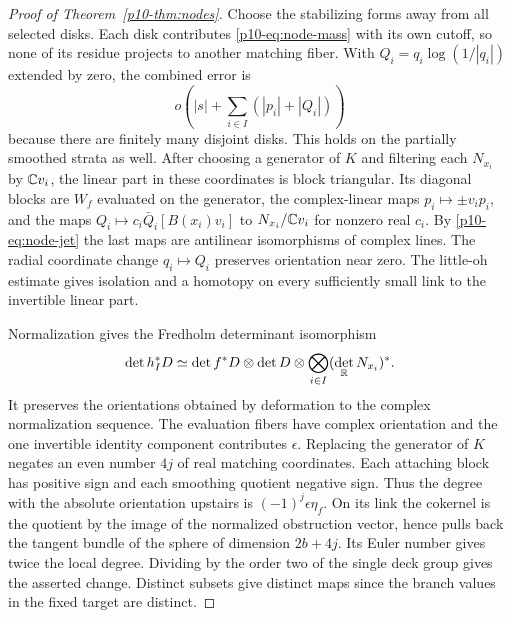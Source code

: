 \begin{proof}[Proof of Theorem~\ref{p10-thm:nodes}]
Choose the stabilizing forms away from all selected disks. Each disk
contributes \eqref{p10-eq:node-mass} with its own cutoff, so none of its
residue projects to another matching fiber. With $Q_i=q_i\log(1/|q_i|)$
extended by zero, the combined error is
\[
             o\left(|s|+\sum_{i\in I}(|p_i|+|Q_i|)\right)
\]
because there are finitely many disjoint disks. This holds on the
partially smoothed strata as well. After choosing a generator of $K$
and filtering each $N_{x_i}$ by $\mathbb C v_i$, the linear part in these
coordinates is block triangular. Its diagonal blocks are $W_f$
evaluated on the generator, the complex-linear maps
$p_i\mapsto\pm v_i p_i$, and the maps
$Q_i\mapsto c_i\bar Q_i[B(x_i)v_i]$ to $N_{x_i}/\mathbb C v_i$ for
nonzero real $c_i$. By \eqref{p10-eq:node-jet} the last maps are
antilinear isomorphisms of complex lines. The radial coordinate
change $q_i\mapsto Q_i$ preserves orientation near zero. The
little-oh estimate gives isolation and a homotopy on every sufficiently
small link to the invertible linear part.

Normalization gives the Fredholm determinant isomorphism
\[
  \det h_I^*D\simeq \det f^*D\otimes\det D\otimes
       \bigotimes_{i\in I}(\det_{\mathbb R}N_{x_i})^* .
\]
It preserves the orientations obtained by deformation to the complex
normalization sequence. The evaluation fibers have complex orientation
and the one invertible identity component contributes $\epsilon$.
Replacing the generator of $K$ negates an even number $4j$ of real
matching coordinates. Each attaching block has positive sign and each
smoothing quotient negative sign. Thus the degree with the absolute
orientation upstairs is $(-1)^j\epsilon\eta_f$. On its link the
cokernel is the quotient by the image of the normalized obstruction
vector, hence pulls back the tangent bundle of the sphere of dimension
$2b+4j$. Its Euler number gives twice the local degree. Dividing by
the order two of the single deck group gives the asserted change.
Distinct subsets give distinct maps since the branch values in the
fixed target are distinct.


\end{proof}
